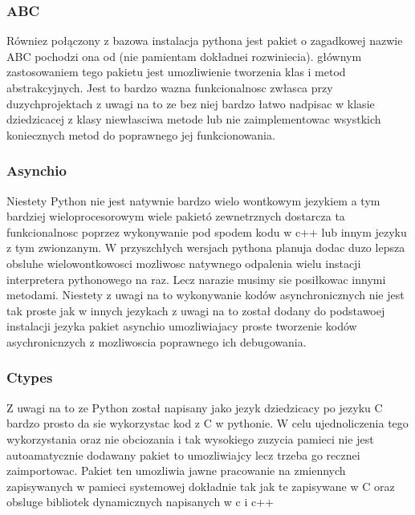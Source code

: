 \documentclass[11pt,a4paper]{article}
\begin{document}
    \subsubsection{ABC}
    \hspace{1cm} Równiez połączony z bazowa instalacja pythona jest pakiet o zagadkowej nazwie ABC pochodzi ona od (nie pamientam dokładnei rozwiniecia). głównym zastosowaniem tego pakietu jest umozliwienie tworzenia klas i metod abstrakcyjnych. Jest to bardzo wazna funkcionalnosc zwłasca przy duzychprojektach z uwagi na to ze bez niej bardzo łatwo nadpisac w klasie dziedzicacej z klasy niewłasciwa metode lub nie zaimplementowac wsystkich koniecznych metod do poprawnego jej funkcionowania.

    \subsubsection{Asynchio}
    \hspace{1cm} Niestety Python nie jest natywnie bardzo wielo wontkowym jezykiem a tym bardziej wieloprocesorowym wiele pakietó zewnetrznych dostarcza ta funkcionalnosc poprzez wykonywanie pod spodem kodu w c++ lub innym jezyku z tym zwionzanym. W przyszchłych wersjach pythona planuja dodac duzo lepsza obsluhe wielowontkowosci mozliwosc natywnego odpalenia wielu instacji interpretera pythonowego na raz. Lecz narazie musimy sie posiłkowac innymi metodami. Niestety z uwagi na to wykonywanie kodów asynchronicznych nie jest tak proste jak w innych jezykach z uwagi na to został dodany do podstawoej instalacji jezyka pakiet asynchio umozliwiajacy proste tworzenie kodów asychronicnzych z mozliwoscia poprawnego ich debugowania.

    \subsubsection{Ctypes}
    \hspace{1cm} Z uwagi na to ze Python został napisany jako jezyk dziedzicacy po jezyku C bardzo prosto da sie wykorzystac kod z C w pythonie. W celu ujednoliczenia tego wykorzystania oraz nie obciozania i tak wysokiego zuzycia pamieci nie jest autoamatycznie dodawany pakiet to umozliwiajcy lecz trzeba go recznei zaimportowac. Pakiet ten umozliwia jawne pracowanie na zmiennych zapisywanych w pamieci systemowej dokładnie tak jak te zapisywane w C oraz obsluge bibliotek dynamicznych napisanych w c i c++
\end{document}

